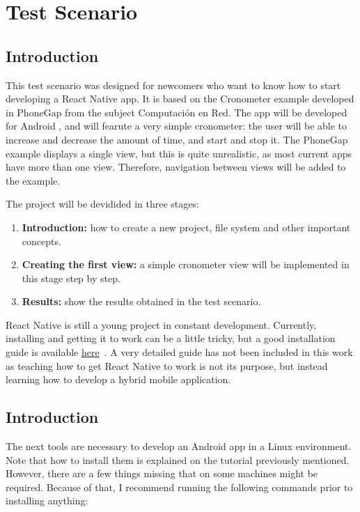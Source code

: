 \chapter{Test Scenario}
\label{ch:testscenario}
\justifying
\section{Introduction}

This test scenario was designed for newcomers who want to know how to start developing a React Native app. It is based on the Cronometer example developed in PhoneGap from the subject Computación en Red. The app will be developed for Android , and will fearute a very simple cronometer: the user will be able to increase and decrease the amount of time, and start and stop it. The PhoneGap example displays a single view, but this is quite unrealistic, as most current apps have more than one view. Therefore, navigation between views will be added to the example.

The project will be devidided in three stages:

\begin{enumerate}
 \item \textbf{Introduction:} how to create a new project, file system and other important concepts.
 \item \textbf{Creating the first view:} a simple cronometer view will be implemented in this stage step by step.
 \item \textbf{Results:} show the results obtained in the test scenario.
\end{enumerate}

React Native is still a young project in constant development. Currently, installing and getting it to work can be a little tricky, but a good installation guide is available \href{https://facebook.github.io/react-native/docs/getting-started.html}{here}~\cite{rninstallguide}. A very detailed guide has not been included in this work as teaching how to get React Native to work is not its purpose, but instead learning how to develop a hybrid mobile application.

\section{Introduction}

The next tools are necessary to develop an Android app in a Linux environment. Note that how to install them is explained on the tutorial previously mentioned. However, there are a few things missing that on some machines might be required. Because of that, I recommend running the following commands prior to installing anything:


